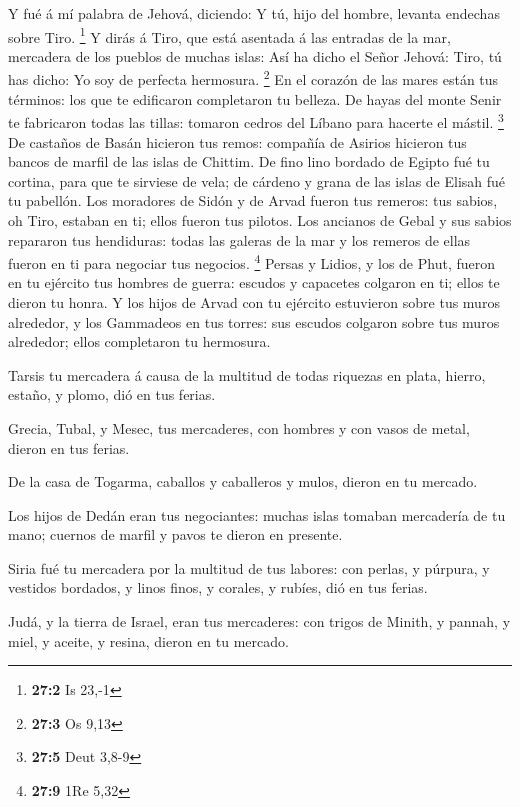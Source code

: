  Y fué á mí palabra de Jehová, diciendo:  Y tú,
hijo del hombre, levanta endechas sobre Tiro. \footnote{\textbf{27:2} Is
  23,-1}  Y dirás á Tiro, que está asentada á las entradas
de la mar, mercadera de los pueblos de muchas islas: Así ha dicho el
Señor Jehová: Tiro, tú has dicho: Yo soy de perfecta hermosura.
\footnote{\textbf{27:3} Os 9,13}  En el corazón de las mares
están tus términos: los que te edificaron completaron tu belleza.
 De hayas del monte Senir te fabricaron todas las tillas:
tomaron cedros del Líbano para hacerte el mástil. \footnote{\textbf{27:5}
  Deut 3,8-9}  De castaños de Basán hicieron tus remos:
compañía de Asirios hicieron tus bancos de marfil de las islas de
Chittim.  De fino lino bordado de Egipto fué tu cortina,
para que te sirviese de vela; de cárdeno y grana de las islas de Elisah
fué tu pabellón.  Los moradores de Sidón y de Arvad fueron
tus remeros: tus sabios, oh Tiro, estaban en ti; ellos fueron tus
pilotos.  Los ancianos de Gebal y sus sabios repararon tus
hendiduras: todas las galeras de la mar y los remeros de ellas fueron en
ti para negociar tus negocios. \footnote{\textbf{27:9} 1Re 5,32}
 Persas y Lidios, y los de Phut, fueron en tu ejército tus
hombres de guerra: escudos y capacetes colgaron en ti; ellos te dieron
tu honra.  Y los hijos de Arvad con tu ejército estuvieron
sobre tus muros alrededor, y los Gammadeos en tus torres: sus escudos
colgaron sobre tus muros alrededor; ellos completaron tu hermosura.

 Tarsis tu mercadera á causa de la multitud de todas
riquezas en plata, hierro, estaño, y plomo, dió en tus ferias.

 Grecia, Tubal, y Mesec, tus mercaderes, con hombres y con
vasos de metal, dieron en tus ferias.

 De la casa de Togarma, caballos y caballeros y mulos,
dieron en tu mercado.

 Los hijos de Dedán eran tus negociantes: muchas islas
tomaban mercadería de tu mano; cuernos de marfil y pavos te dieron en
presente.

 Siria fué tu mercadera por la multitud de tus labores: con
perlas, y púrpura, y vestidos bordados, y linos finos, y corales, y
rubíes, dió en tus ferias.

 Judá, y la tierra de Israel, eran tus mercaderes: con
trigos de Minith, y pannah, y miel, y aceite, y resina, dieron en tu
mercado.


